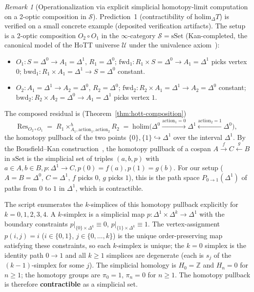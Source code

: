 \documentclass[11pt,a4paper]{article}
\theoremstyle{plain}
\theoremstyle{definition}
\theoremstyle{remark}
\newtheorem{remark}[theorem]{Remark}
\begin{document}
\begin{remark}[Operationalization via explicit simplicial homotopy-limit
computation on a 2-optic composition in $\mathcal{S}$]
\label{rem:hott-holim}
Prediction~1 (contractibility of $\mathrm{holim}_\Delta T$) is verified
on a small concrete example (deposited verification artifacts). The setup is a 2-optic composition
$O_2 \circ O_1$ in the $\infty$-category $\mathcal{S} = \mathrm{sSet}$
(Kan-completed, the canonical model of the HoTT universe $\mathcal{U}$
under the univalence axiom~\cite{hottbook2013}):
\begin{itemize}[leftmargin=*, itemsep=2pt]
\item $O_1 : S = \Delta^0 \to A_1 = \Delta^1$, $R_1 = \Delta^0$;
  $\mathrm{fwd}_1 : R_1 \times S = \Delta^0 \to A_1 = \Delta^1$ picks
  vertex $0$;
  $\mathrm{bwd}_1 : R_1 \times A_1 = \Delta^1 \to S = \Delta^0$
  constant.
\item $O_2 : A_1 = \Delta^1 \to A_2 = \Delta^0$, $R_2 = \Delta^0$;
  $\mathrm{fwd}_2 : R_2 \times A_1 = \Delta^1 \to A_2 = \Delta^0$
  constant;
  $\mathrm{bwd}_2 : R_2 \times A_2 = \Delta^0 \to A_1 = \Delta^1$
  picks vertex $1$.
\end{itemize}
The composed residual is (Theorem~\ref{thm:hott-composition})
\[
  \mathrm{Res}_{O_2 \circ O_1} \;=\; R_1 \times^h_{A_1, \mathrm{action}_1, \mathrm{action}_2} R_2
  \;=\; \mathrm{holim}\bigl( \Delta^0 \xrightarrow{\mathrm{action}_1 = 0} \Delta^1 \xleftarrow{\mathrm{action}_2 = 1} \Delta^0 \bigr),
\]
the homotopy pullback of the two points $\{0\}, \{1\} \hookrightarrow
\Delta^1$ over the interval $\Delta^1$. By the Bousfield--Kan
construction~\citep{bousfield1972}, the homotopy pullback of a
cospan $A \xrightarrow{f} C \xleftarrow{g} B$ in $\mathrm{sSet}$ is
the simplicial set of triples $(a, b, p)$ with $a \in A, b \in B, p :
\Delta^1 \to C, p(0) = f(a), p(1) = g(b)$. For our setup
($A = B = \Delta^0$, $C = \Delta^1$, $f$ picks $0$, $g$ picks $1$),
this is the path space $P_{0 \to 1}(\Delta^1)$ of paths from $0$ to
$1$ in $\Delta^1$, which is contractible.

The script enumerates the $k$-simplices of this homotopy pullback
explicitly for $k = 0, 1, 2, 3, 4$. A $k$-simplex is a simplicial
map $p : \Delta^1 \times \Delta^k \to \Delta^1$ with the boundary
constraints $p|_{\{0\} \times \Delta^k} \equiv 0$,
$p|_{\{1\} \times \Delta^k} \equiv 1$. The vertex-assignment
$p(i, j) = i$ ($i \in \{0, 1\}$, $j \in \{0, \ldots, k\}$) is the
unique order-preserving map satisfying these constraints, so each
$k$-simplex is unique; the $k = 0$ simplex is the identity path
$0 \to 1$ and all $k \geq 1$ simplices are degenerate (each is
$s_j$ of the $(k-1)$-simplex for some $j$). The simplicial homology
is $H_0 = \mathbb{Z}$ and $H_n = 0$ for $n \geq 1$; the homotopy
groups are $\pi_0 = 1$, $\pi_n = 0$ for $n \geq 1$. The homotopy
pullback is therefore \textbf{contractible} as a simplicial set.


\end{remark}
\end{document}
